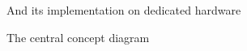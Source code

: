 \begin{frame}[label=real-10]{And its implementation on dedicated hardware}
\end{frame}

\begin{frame}[label=real-100]{The central concept diagram}
\centering
{}
\end{frame}

%